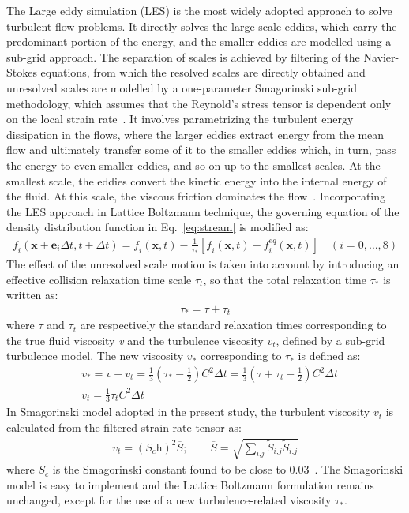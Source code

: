 The Large eddy simulation (LES) is the most widely adopted approach to solve turbulent flow problems. It directly solves the large scale eddies, which carry the predominant portion of the energy, and the smaller eddies are modelled using a sub-grid approach. The separation of scales is achieved by filtering of the Navier-Stokes equations, from which the resolved scales are directly obtained and unresolved scales are modelled by a one-parameter Smagorinski sub-grid methodology, which assumes that the Reynold's stress tensor is dependent only on the local strain rate~\citep{smagorinsky1963}. It involves parametrizing the turbulent energy dissipation in the flows, where the larger eddies extract energy from the mean flow and ultimately transfer some of it to the smaller eddies which, in turn, pass the energy to even smaller eddies, and so on up to the smallest scales. At the smallest scale, the eddies convert the kinetic energy into the internal energy of the fluid. At this scale, the viscous friction dominates the flow~\citep{frisch1995}. Incorporating the LES approach in Lattice Boltzmann technique, the governing equation of the density distribution function in Eq.~\eqref{eq:stream} is modified as:
\begin{align}
\textit{f}_{\textit{i}}(\mathbf{x}+\mathbf{e}_{\textit{i}} \Delta t, t + \Delta t) = \textit{f}_{\textit{i}}(\mathbf{x},t) - \frac{1}{\tau_{*}} [\textit{f}_{\textit{i}}(\mathbf{x},t) -\textit{f}_{\textit{i}}^{\textit{eq}}(\mathbf{x},t)] \quad (\textit{i}=0,\dots,8)
\end{align}
The effect of the unresolved scale motion is taken into account by introducing an effective collision relaxation time scale $\tau_{t}$, so that the total relaxation time $\tau_{*}$ is written as:
\begin{align}
\tau_{*}=\tau + \tau_{t}
\end{align} 
where $\tau$ and $\tau_{t}$ are respectively the standard relaxation times corresponding to the true fluid viscosity \textit{v} and the turbulence viscosity $\textit{v}_{\textit{t}}$, defined by a sub-grid turbulence model. The new viscosity $\textit{v}_{*}$ corresponding to $\tau_{*}$ is defined as:
\begin{align}
& \textit{v}_{*}=\textit{v}+\textit{v}_{\textit{t}}=\frac{1}{3}(\tau_{*}-\frac{1}{2})\textit{C}^{2} \Delta \textit{t} =\frac{1}{3}(\tau+\tau_{t}-\frac{1}{2})\textit{C}^{2} \Delta \textit{t}  \\
& \textit{v}_{\textit{t}}=\frac{1}{3}\tau_{\textit{t}}\textit{C}^{2} \Delta \textit{t}
\end{align}
In Smagorinski model adopted in the present study, the turbulent viscosity $\textit{v}_{t}$ is calculated from the filtered strain rate tensor as:
\begin{align}
\textit{v}_{\textit{t}}=(\textit{S}_{c}\textit{h})^{2}\overline{S}; \qquad \overline{S}=\sqrt{\sum\limits_{\textit{i,j}}{\tilde{S}_{\textit{i,j}}\tilde{S}_{\textit{i,j}}}}
\end{align}
where $\textit{S}_{c}$ is the Smagorinski constant found to be close to 0.03~\citep{yu2005}. The Smagorinski model is easy to implement and the Lattice Boltzmann formulation remains unchanged, except for the use of a new turbulence-related viscosity $\tau_{*}$.

